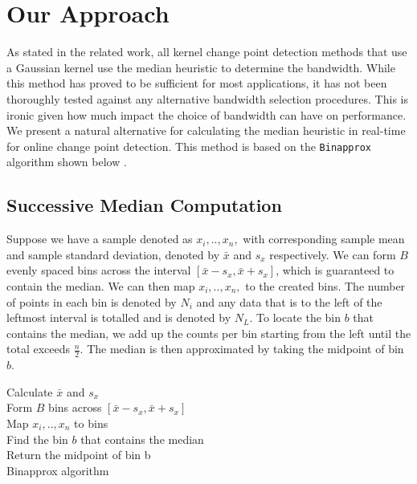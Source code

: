 
\section{Our Approach}
\label{our_approach}

As stated in the related work, all kernel change point detection methods that use a Gaussian kernel use the median heuristic to determine the bandwidth. While this method has proved to be sufficient for most applications, it has not been thoroughly tested against any alternative bandwidth selection procedures. This is ironic given how much impact the choice of bandwidth can have on performance. We present a natural alternative for calculating the median heuristic in real-time for online change point detection. This method is based on the \texttt{Binapprox} algorithm shown below \cite{tibshirani2008fast}. 

\subsection{Successive Median Computation}
Suppose we have a sample denoted as $x_i,..,x_n,$ with corresponding sample mean and sample standard deviation, denoted by $\bar{x}$ and $s_x$ respectively. We can form $B$ evenly spaced bins across the interval $[\bar{x} - s_x, \bar{x} + s_x]$, which is guaranteed to contain the median. We can then map $x_i,..,x_n,$ to the created bins. The number of points in each bin is denoted by $N_i$ and any data that is to the left of the leftmost interval is totalled and is denoted by $N_L$. To locate the bin $b$ that contains the median, we add up the counts per bin starting from the left until the total exceeds $\frac{n}{2}.$ The median is then approximated by taking the midpoint of bin $b$.

\begin{center}
\begin{algorithm}[H]
\SetAlgoLined
{}
Calculate $\bar{x}$ and $s_x$\\
Form $B$ bins across $[\bar{x} - s_x, \bar{x} + s_x]$\\
Map $x_i,..,x_n$ to bins\\
Find the bin $b$ that contains the median\\
Return the midpoint of bin b\\
 \caption{Binapprox algorithm}
\end{algorithm}
\end{center}

